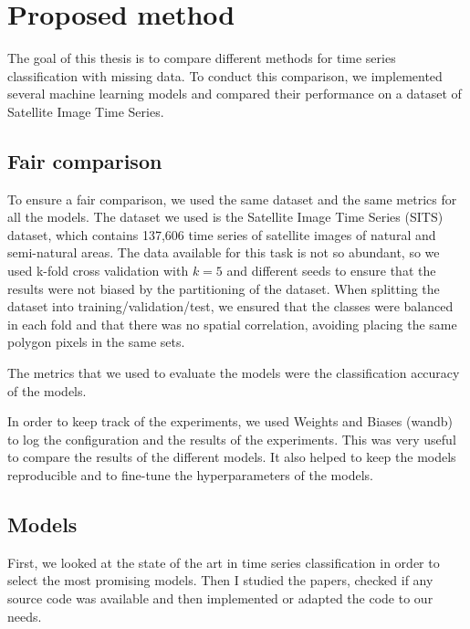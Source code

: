 \chapter{Proposed method}
The goal of this thesis is to compare different methods for time series classification with missing data.
To conduct this comparison, we implemented several machine learning models and compared their performance on a dataset of Satellite Image Time Series.

\section{Fair comparison}
To ensure a fair comparison, we used the same dataset and the same metrics for all the models.
The dataset we used is the Satellite Image Time Series (SITS) dataset, which contains 137,606 time series of satellite images of natural and semi-natural areas. 
The data available for this task is not so abundant, so we used k-fold cross validation with $k=5$ and different seeds to ensure that the results were not biased by the partitioning of the dataset.
When splitting the dataset into training/validation/test, we ensured that the classes were balanced in each fold and that there was no spatial correlation, avoiding placing the same polygon pixels in the same sets.

The metrics that we used to evaluate the models were the classification accuracy of the models.

In order to keep track of the experiments, we used Weights and Biases (wandb) to log the configuration and the results of the experiments.
This was very useful to compare the results of the different models. It also helped to keep the models reproducible and to fine-tune the hyperparameters of the models.

\section{Models}
First, we looked at the state of the art in time series classification in order to select the most promising models.
Then I studied the papers, checked if any source code was available and then implemented or adapted the code to our needs.

